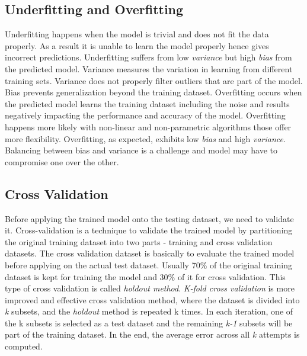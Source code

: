 \documentclass[sigconf]{acmart}
\begin{document}
	\subsection{Underfitting and Overfitting}
	Underfitting happens when the model is trivial and does not fit the data properly. As a result it is unable to learn the model properly hence gives incorrect predictions. Underfitting suffers from low {\em variance} but high {\em bias} from the predicted model. Variance measures the variation in learning from different training sets.  Variance does not properly filter outliers that are part of the model. Bias prevents generalization beyond the training dataset. Overfitting occurs when the predicted model learns the training dataset including the noise and results negatively impacting the performance and accuracy of the model. Overfitting happens more likely with non-linear and non-parametric algorithms those offer more flexibility. Overfitting, as expected, exhibits low {\em bias} and high {\em variance}. Balancing between bias and variance is a challenge and model may have to compromise one over the other. 
	
	\subsection{Cross Validation}
	
	Before applying the trained model onto the testing dataset, we need to validate it. Cross-validation is a technique to validate the trained model by partitioning the original training dataset into two parts - training and cross validation datasets. The cross validation dataset is basically to evaluate the trained model before applying on the actual test dataset. Usually 70\% of the original training dataset is kept for training the model and 30\% of it for cross validation. This type of cross validation is called {\em holdout  method}. {\em K-fold cross validation} is more improved and effective cross validation method, where the dataset is divided into {\em k} subsets, and the {\em holdout} method is repeated k times. In each iteration, one of the k subsets is selected as a test dataset and the remaining {\em k-1} subsets will be part of the training dataset. In the end, the average error across all {\em k} attempts is computed.
	
\end{document}

